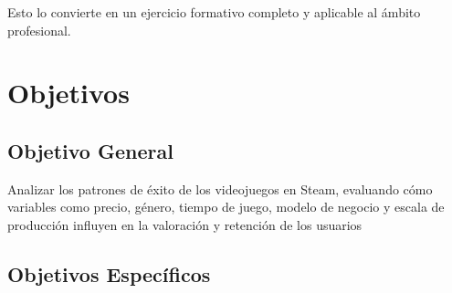 \documentclass[oneside,11pt]{Latex/Classes/PhDthesisPSnPDF}
\begin{document}
Esto lo convierte en un ejercicio formativo completo y aplicable al
ámbito profesional.

\section{Objetivos}

\subsection{Objetivo General}

Analizar los patrones de éxito de los videojuegos en Steam, evaluando
cómo variables como precio, género, tiempo de juego, modelo de negocio y
escala de producción influyen en la valoración y retención de los
usuarios

\subsection{Objetivos Específicos}
\end{document}
